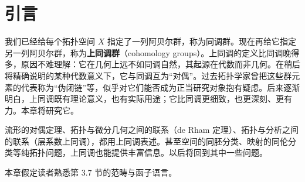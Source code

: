\section{引言}
我们已经给每个拓扑空间 $X$ 指定了一列阿贝尔群，称为同调群。现在再给它指定另一列阿贝尔群，称为\textbf{上同调群}（cohomology groups）。上同调的定义比同调晚得多，原因不难理解：它在几何上远不如同调自然，其起源在代数而非几何。在稍后将精确说明的某种代数意义下，它与同调互为“对偶”。过去拓扑学家曾把这些群元素的代表称为“伪闭链”等，似乎对它们能否成为正当研究对象抱有疑虑。后来逐渐明白，上同调既有理论意义，也有实际用途；它比同调更细致，也更深刻、更有力。本章将研究它。

流形的对偶定理、拓扑与微分几何之间的联系（de Rham 定理）、拓扑与分析之间的联系（层系数上同调），都用上同调表述。甚至空间的同胚分类、映射的同伦分类等纯拓扑问题，上同调也能提供丰富信息。以后将回到其中一些问题。

本章假定读者熟悉第 3.7 节的范畴与函子语言。
